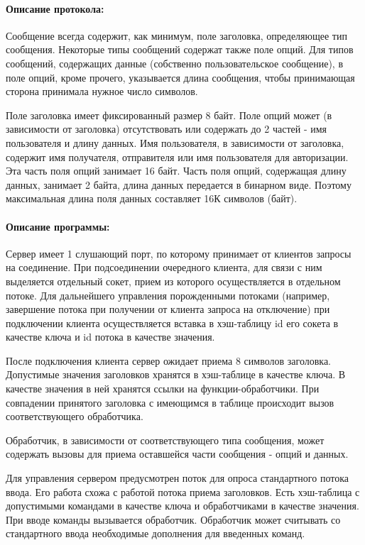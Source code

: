 \paragraph{Описание протокола:}

Сообщение всегда содержит, как минимум, поле заголовка, определяющее тип сообщения. Некоторые типы сообщений содержат также поле опций. Для типов сообщений, содержащих данные (собственно пользовательское сообщение), в поле опций, кроме прочего, указывается длина сообщения, чтобы принимающая сторона принимала нужное число символов.

Поле заголовка имеет фиксированный размер 8 байт. Поле опций может (в зависимости от заголовка) отсутствовать или содержать до 2 частей - имя пользователя и длину данных. Имя пользователя, в зависимости от заголовка, содержит имя получателя, отправителя или имя пользователя для авторизации. Эта часть поля опций занимает 16 байт. Часть поля опций, содержащая длину данных, занимает 2 байта, длина данных передается в бинарном виде. Поэтому максимальная длина поля данных составляет 16К символов (байт).

\paragraph{Описание программы:}

Сервер имеет 1 слушающий порт, по которому принимает от клиентов запросы на соединение. При подсоединении очередного клиента, для связи с ним выделяется отдельный сокет, прием из которого осуществляется в отдельном потоке. Для дальнейшего управления порожденными потоками (например, завершение потока при получении от клиента запроса на отключение) при подключении клиента осуществляется вставка в хэш-таблицу id его сокета в качестве ключа и id потока в качестве значения.

После подключения клиента сервер ожидает приема 8 символов заголовка. Допустимые значения заголовков хранятся в хэш-таблице в качестве ключа. В качестве значения в ней хранятся ссылки на функции-обработчики. При совпадении принятого заголовка с имеющимся в таблице происходит вызов соответствующего обработчика.

Обработчик, в зависимости от соответствующего типа сообщения, может содержать вызовы для приема оставшейся части сообщения - опций и данных.

Для управления сервером предусмотрен поток для опроса стандартного потока ввода. Его работа схожа с работой потока приема заголовков. Есть хэш-таблица с допустимыми командами в качестве ключа и обработчиками в качестве значения. При вводе команды вызывается обработчик. Обработчик может считывать со стандартного ввода необходимые дополнения для введенных команд.

